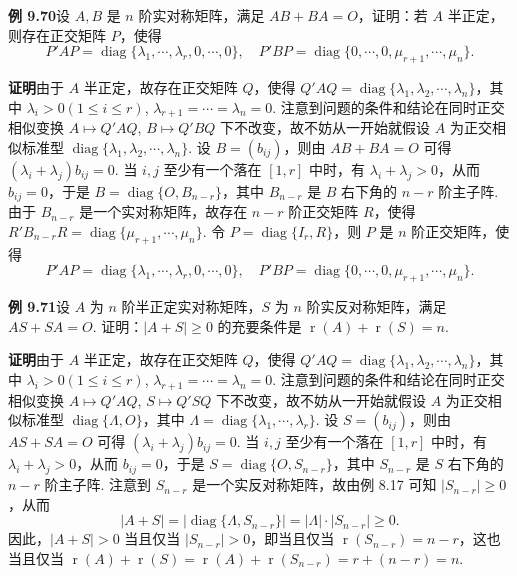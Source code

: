 \documentclass[UTF8, 12pt, fontset=fandol, oneside]{ctexart}
\begin{document}
\noindent\textbf{例 9.70}\quad 设 $A,B$ 是 $n$ 阶实对称矩阵，满足 $AB+BA=O$，证明：若 $A$ 半正定，则存在正交矩阵 $P$，使得
\[
P'AP=\operatorname{diag}\{\lambda_1,\cdots,\lambda_r,0,\cdots,0\},\quad
P'BP=\operatorname{diag}\{0,\cdots,0,\mu_{r+1},\cdots,\mu_n\}.
\]

\noindent\textbf{证明}\quad 由于 $A$ 半正定，故存在正交矩阵 $Q$，使得 $Q'AQ=\operatorname{diag}\{\lambda_1,\lambda_2,\cdots,\lambda_n\}$，其中 $\lambda_i>0(1\le i\le r)$, $\lambda_{r+1}=\cdots=\lambda_n=0$. 注意到问题的条件和结论在同时正交相似变换 $A\mapsto Q'AQ$, $B\mapsto Q'BQ$ 下不改变，故不妨从一开始就假设 $A$ 为正交相似标准型 $\operatorname{diag}\{\lambda_1,\lambda_2,\cdots,\lambda_n\}$. 设 $B=(b_{ij})$，则由 $AB+BA=O$ 可得 $(\lambda_i+\lambda_j)b_{ij}=0$. 当 $i,j$ 至少有一个落在 $[1,r]$ 中时，有 $\lambda_i+\lambda_j>0$，从而 $b_{ij}=0$，于是 $B=\operatorname{diag}\{O,B_{n-r}\}$，其中 $B_{n-r}$ 是 $B$ 右下角的 $n-r$ 阶主子阵. 由于 $B_{n-r}$ 是一个实对称矩阵，故存在 $n-r$ 阶正交矩阵 $R$，使得 $R'B_{n-r}R=\operatorname{diag}\{\mu_{r+1},\cdots,\mu_n\}$. 令 $P=\operatorname{diag}\{I_r,R\}$，则 $P$ 是 $n$ 阶正交矩阵，使得
\[
P'AP=\operatorname{diag}\{\lambda_1,\cdots,\lambda_r,0,\cdots,0\},\quad
P'BP=\operatorname{diag}\{0,\cdots,0,\mu_{r+1},\cdots,\mu_n\}.
\]

\noindent\textbf{例 9.71}\quad 设 $A$ 为 $n$ 阶半正定实对称矩阵，$S$ 为 $n$ 阶实反对称矩阵，满足 $AS+SA=O$. 证明：$|A+S|\ge0$ 的充要条件是 $\operatorname{r}(A)+\operatorname{r}(S)=n$.

\noindent\textbf{证明}\quad 由于 $A$ 半正定，故存在正交矩阵 $Q$，使得 $Q'AQ=\operatorname{diag}\{\lambda_1,\lambda_2,\cdots,\lambda_n\}$，其中 $\lambda_i>0(1\le i\le r)$, $\lambda_{r+1}=\cdots=\lambda_n=0$. 注意到问题的条件和结论在同时正交相似变换 $A\mapsto Q'AQ$, $S\mapsto Q'SQ$ 下不改变，故不妨从一开始就假设 $A$ 为正交相似标准型 $\operatorname{diag}\{\Lambda,O\}$，其中 $\Lambda=\operatorname{diag}\{\lambda_1,\cdots,\lambda_r\}$. 设 $S=(b_{ij})$，则由 $AS+SA=O$ 可得 $(\lambda_i+\lambda_j)b_{ij}=0$. 当 $i,j$ 至少有一个落在 $[1,r]$ 中时，有 $\lambda_i+\lambda_j>0$，从而 $b_{ij}=0$，于是 $S=\operatorname{diag}\{O,S_{n-r}\}$，其中 $S_{n-r}$ 是 $S$ 右下角的 $n-r$ 阶主子阵. 注意到 $S_{n-r}$ 是一个实反对称矩阵，故由例 8.17 可知 $|S_{n-r}|\ge0$，从而
\[
|A+S|=|\operatorname{diag}\{\Lambda,S_{n-r}\}|=|\Lambda|\cdot |S_{n-r}|\ge0.
\]
因此，$|A+S|>0$ 当且仅当 $|S_{n-r}|>0$，即当且仅当 $\operatorname{r}(S_{n-r})=n-r$，这也当且仅当 $\operatorname{r}(A)+\operatorname{r}(S)=\operatorname{r}(A)+\operatorname{r}(S_{n-r})=r+(n-r)=n$.
\end{document}
